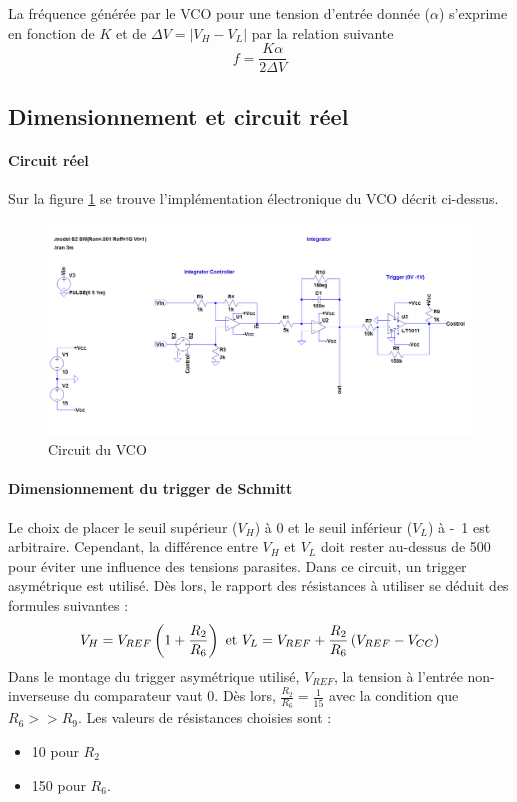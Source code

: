 La fréquence générée par le VCO pour une tension d'entrée donnée ($\alpha$) s'exprime en fonction de $K$ et de $\Delta V = \vert V_H - V_L\vert $ par la relation suivante $$ f = \frac{K\alpha}{2\Delta V}$$

\subsection{Dimensionnement et circuit réel}
\paragraph{Circuit réel}
Sur la figure \ref{fig:circuit_vco} se trouve l'implémentation électronique du VCO décrit ci-dessus.
\begin{figure}[ht]
\centering
\includegraphics[width=16cm]{img-vco/vco_circuit}
\caption{Circuit du VCO}
\label{fig:circuit_vco}
\end{figure}
\paragraph{Dimensionnement du trigger de Schmitt}
Le choix de placer le seuil supérieur ($V_H$) à \unit{0}{\volt} et le seuil inférieur ($V_L$) à \unit{-1}{\volt} est arbitraire. Cependant, la différence entre $V_H$ et $V_L$ doit rester au-dessus de \unit{500}{\milli\volt} pour éviter une influence des tensions parasites. Dans ce circuit, un trigger asymétrique est utilisé. Dès lors, le rapport des résistances à utiliser se déduit des formules suivantes : 
$$V_H=V_{REF}\left(1+\frac{R_2}{R_6}\right) \textmd{ et } V_L=V_{REF} + \frac{R_2}{R_6}\left(V_{REF}-V_{CC}\right)$$
Dans le montage du trigger asymétrique utilisé, $V_{REF}$, la tension à l'entrée non-inverseuse du comparateur vaut \unit{0}{\volt}. Dès lors, $\frac{R_2}{R_6}=\frac{1}{15}$
avec la condition que $R_6>>R_9$. Les valeurs de résistances choisies sont :
\begin{itemize}
\item \unit{10}{\kilo\ohm} pour $R_2$
\item \unit{150}{\kilo\ohm} pour $R_6$.
\end{itemize}

